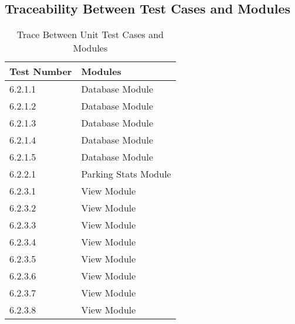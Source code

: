 \documentclass[12pt, titlepage]{article}
\begin{document}
					
					

					
					
					
					




\subsection{Traceability Between Test Cases and Modules}
\begin{table}[H]
\centering
\begin{tabular}{p{} p{}}
\toprule
\textbf{Test Number} & \textbf{Modules}\\
\midrule
6.2.1.1 & Database Module\\
6.2.1.2 & Database Module\\
6.2.1.3 & Database Module\\
6.2.1.4 & Database Module\\
6.2.1.5 & Database Module\\
\midrule
6.2.2.1 & Parking Stats Module\\
\midrule
6.2.3.1 & View Module\\
6.2.3.2 & View Module\\
6.2.3.3 & View Module\\
6.2.3.4 & View Module\\
6.2.3.5 & View Module\\
6.2.3.6 & View Module\\
6.2.3.7 & View Module\\
6.2.3.8 & View Module\\
\bottomrule
\end{tabular}
\caption{Trace Between Unit Test Cases and Modules}
\label{TblRT}
\end{table}
\end{document}
